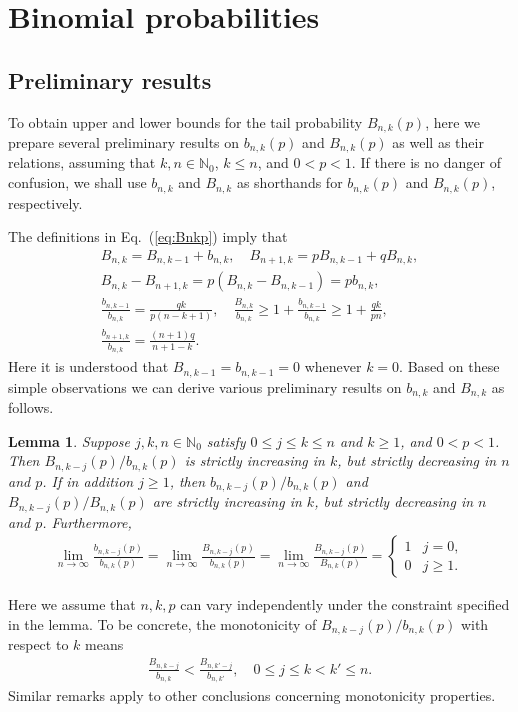 \documentclass[aop]{imsart}
\theoremstyle{plain}
\newtheorem{lemma}[theorem]{Lemma}
\theoremstyle{remark}
\newcommand{\bbN}{\mathbb{N}}
\newcommand{\1}{\operatorname{\uppercase\expandafter{\romannumeral1}}}
\newcommand{\2}{\operatorname{\uppercase\expandafter{\romannumeral2}}}
\newcommand{\3}{\operatorname{\uppercase\expandafter{\romannumeral3}}}
\newcommand{\4}{\operatorname{\uppercase\expandafter{\romannumeral4}}}
\newcommand{\5}{\operatorname{\uppercase\expandafter{\romannumeral5}}}
\newcommand{\6}{\operatorname{\uppercase\expandafter{\romannumeral6}}}
\newcommand{\7}{\operatorname{\uppercase\expandafter{\romannumeral7}}}
\newcommand{\8}{\operatorname{\uppercase\expandafter{\romannumeral8}}}
\newcommand{\9}{\operatorname{\uppercase\expandafter{\romannumeral9}}}
\newcommand{\eref}[1]{Eq.~\textup{(\ref{#1})}}
\begin{document}
\section{Binomial probabilities}\label{sec:BinProb}

\subsection{Preliminary results}
To obtain upper and lower bounds for the tail probability
$B_{n,k}(p)$, here we prepare several preliminary results on  $b_{n,k}(p)$ and $B_{n,k}(p)$ as well as their relations, assuming that $k,n\in \bbN_0$, $k\leq n$, and $0<p<1$.  If there is no danger of confusion, we shall use $b_{n,k}$ and $B_{n,k}$ as shorthands for $b_{n,k}(p)$ and $B_{n,k}(p)$, respectively. 



The definitions in \eref{eq:Bnkp} imply that 
\begin{gather}
B_{n,k}=B_{n,k-1}+b_{n,k},\quad 
B_{n+1,k}=p B_{n,k-1}+q B_{n,k}, \label{eq:Bn+1k=Bnk-1+Bnk}\\
B_{n,k}-B_{n+1,k}=p (B_{n,k}-B_{n,k-1})=p b_{n,k}, \label{eq:Deltank}\\
\frac{b_{n,k-1}}{b_{n,k}}=\frac{q k}{p(n-k+1)}, \quad \frac{B_{n,k}}{b_{n,k}}\geq1+\frac{b_{n,k-1}}{b_{n,k}}\geq 1+\frac{q k}{p n },
\label{eq:bnk-1/bnk}\\ \frac{b_{n+1,k}}{b_{n,k}}=\frac{(n+1)q}{n+1-k}. \label{eq:bn+1k/bnk}
\end{gather}
Here it is understood that $B_{n,k-1}=b_{n,k-1}=0$ whenever $k=0$. Based on these simple observations we can derive various preliminary results on $b_{n,k}$ and $B_{n,k}$ as follows.


\begin{lemma}\label{lem:Bbnk-jp}
	Suppose  $j,k,n\in \bbN_0$ satisfy  $0\leq j\leq k\leq n$ and $k\geq 1$, and $0<p<1$. Then  $B_{n,k-j}(p)/b_{n,k}(p)$ is strictly increasing in  $k$, but strictly decreasing in $n$ and $p$. If in addition $j\geq 1$, then  $b_{n,k-j}(p)/b_{n,k}(p)$ and $B_{n,k-j}(p)/B_{n,k}(p)$ are strictly increasing in $k$, but strictly decreasing in $n$ and $p$. Furthermore,
	\begin{align}\label{eq:Bbnk-jplim}
	\lim_{n\to\infty}\frac{b_{n,k-j}(p)}{b_{n,k}(p)}=\lim_{n\to\infty}\frac{B_{n,k-j}(p)}{b_{n,k}(p)}=\lim_{n\to\infty}\frac{B_{n,k-j}(p)}{B_{n,k}(p)}=\begin{cases} 1 & j=0,\\
	0 &j\geq 1.
	\end{cases}
	\end{align}	
\end{lemma}
Here we assume that $n,k,p$ can vary independently under the constraint specified in the lemma. To be concrete, the monotonicity of $B_{n,k-j}(p)/b_{n,k}(p)$ with respect to $k$ means 
\begin{align} 
\frac{B_{n,k-j}}{b_{n,k}}< \frac{B_{n,k'-j}}{b_{n,k'}},\quad 0\leq j\leq k< k'\leq n. \label{eq:bnkmjbnk}
\end{align}
Similar remarks apply to other conclusions concerning monotonicity properties. 
\end{document}
